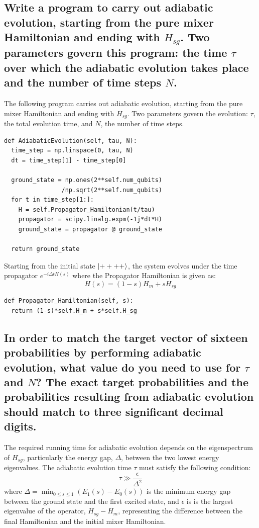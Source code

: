 \documentclass[a4paper, 11pt]{article}
\begin{document}
\subsection*{Write a program to carry out adiabatic evolution, starting from the pure mixer Hamiltonian and ending with $H_{sg}$. Two parameters govern this program: the time $\tau$ over which the adiabatic evolution takes place and the number of time steps $N$.}
The following program carries out adiabatic evolution, starting from the pure mixer Hamiltonian and ending with $H_{sg}$.
Two parameters govern the evolution: $\tau$, the total evolution time, and $N$, the number of time steps.
\begin{verbatim}
def AdiabaticEvolution(self, tau, N):
  time_step = np.linspace(0, tau, N)
  dt = time_step[1] - time_step[0]
  
  ground_state = np.ones(2**self.num_qubits)
                /np.sqrt(2**self.num_qubits)
  for t in time_step[1:]:
    H = self.Propagator_Hamiltonian(t/tau)
    propagator = scipy.linalg.expm(-1j*dt*H)
    ground_state = propagator @ ground_state
  
  return ground_state
\end{verbatim}
Starting from the initial state $\ket{++++}$, the system evolves under the time propagator $e^{-i \Delta t H(s)}$
where the Propagator Hamiltonian is given as:
\begin{equation}
  H(s) = (1-s)H_m + s H_{sg}
\end{equation}
\begin{verbatim}
def Propagator_Hamiltonian(self, s):
  return (1-s)*self.H_m + s*self.H_sg
\end{verbatim}

\subsection*{In order to match the target vector of sixteen probabilities by performing adiabatic evolution, what value do you need to use for $\tau$ and $N$? The exact target probabilities and the probabilities resulting from adiabatic evolution should match to three significant decimal digits.}
The required running time for adiabatic evolution depends on the eigenspectrum of $H_{sg}$, particularly the energy gap, $\Delta$,  between the two lowest energy eigenvalues\cite{farhi2002quantumadiabaticevolutionalgorithms,doi:10.1126/science.1057726}. The adiabatic evolution time $\tau$ must satisfy the following condition:
\begin{equation}
  \tau \gg \frac{\epsilon}{\Delta^{2}}
\end{equation}
where $\Delta = \min_{0\leq s \leq 1} (E_1 (s) - E_0 (s))$ is the minimum energy gap between the ground state and the first excited state, 
and $\epsilon$ is is the largest eigenvalue of the operator, $H_{sg} - H_{m}$, representing the difference between the final Hamiltonian and the initial mixer Hamiltonian.
\end{document}
